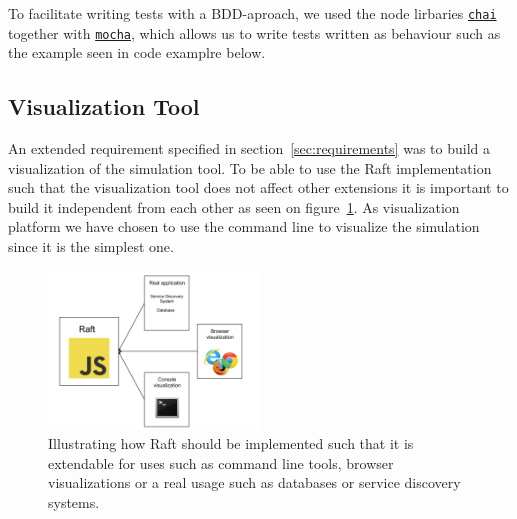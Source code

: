 To facilitate writing tests with a BDD-aproach, we used the node lirbaries \href{http://chaijs.com/}{\tt chai} together with \href{http://mochajs.org}{\tt mocha}, which allows us to write tests written as behaviour such as the example seen in code examplre below.




\subsection{Visualization Tool} %
\label{sub:visualization_tool}

An extended requirement specified in section~\ref{sec:requirements} was to build a visualization of the simulation tool. To be able to use the Raft implementation such that the visualization tool does not affect other extensions it is important to build it independent from each other as seen on figure~\ref{fig:algorithm_extension_visualization}. As visualization platform we have chosen to use the command line to visualize the simulation since it is the simplest one.

\begin{figure}[h]
  \centering
  \includegraphics[width=0.5\textwidth]{figures/implementation_extensions.png}
  \caption{Illustrating how Raft should be implemented such that it is extendable for uses such as command line tools, browser visualizations or a real usage such as databases or service discovery systems.}
  \label{fig:algorithm_extension_visualization}
\end{figure}


